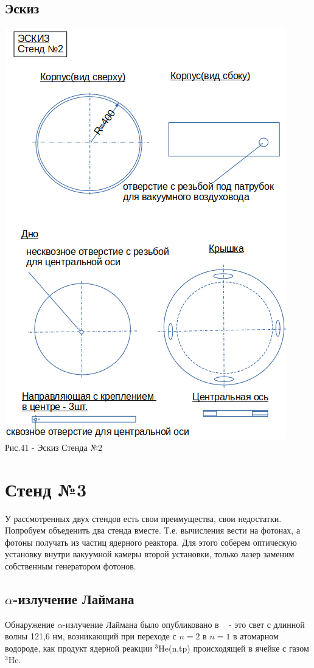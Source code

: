 \documentclass[11pt]{report}
\begin{document}
\subsection{Эскиз}
\includegraphics[scale=0.8]{stend_2}\\
Рис.41 - Эскиз Стенда №2 \\

\section{Стенд №3 }
У рассмотренных двух стендов есть свои преимущества, свои недостатки. Попробуем объеденить два стенда вместе. Т.е. вычисления вести на фотонах, а фотоны получать из частиц ядерного реактора. Для этого соберем оптическую установку внутри вакуумной камеры второй установки, только лазер заменим собственным генератором фотонов. \\

\subsection{$\alpha$-излучение Лаймана} 
Обнаружение $\alpha$-излучение Лаймана было опубликовано в ~\cite{Lymon_1} - это свет с длинной волны 121,6 нм, возникающий при переходе с $n=2$ в $n=1$ в атомарном водороде, как продукт ядерной реакции $^3 $He(n,tp) происходящей в ячейке с газом $^3 $He.\\
\end{document}
